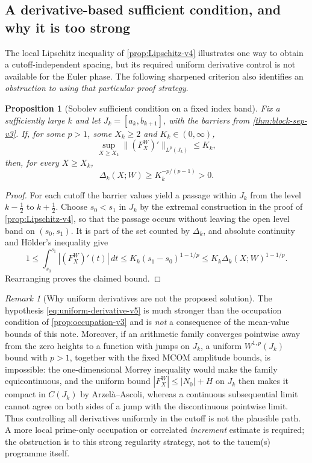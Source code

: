 \documentclass[11pt,a4paper]{article}
\numberwithin{equation}{section}
\newtheorem{proposition}[theorem]{Proposition}
\theoremstyle{definition}
\theoremstyle{remark}
\newtheorem{remark}[theorem]{Remark}
\begin{document}
\subsection{A derivative-based sufficient condition, and why it is too strong}
The local Lipschitz inequality of \cref{prop:Lipschitz-v4}
illustrates one way to obtain a cutoff-independent spacing, but
its required uniform derivative control is not available for the
Euler phase.  The following sharpened criterion also identifies an
\emph{obstruction to using that particular proof strategy}.
\begin{proposition}[Sobolev sufficient condition on a fixed index band]
\label{prop:sobolev-v5}
Fix a sufficiently large $k$ and let
$J_k=[a_k,b_{k+1}]$, with the barriers from
\cref{thm:block-sep-v3}.  If, for some $p>1$, some $X_k\ge2$ and
$K_k\in(0,\infty)$,
\begin{equation}\label{eq:uniform-derivative-v5}
 \sup_{X\ge X_k}\bigl\|(F_X^W)'\bigr\|_{L^p(J_k)}\le K_k,
\end{equation}
then, for every $X\ge X_k$,
\begin{equation}\label{eq:sobolev-spacing-v5}
 \boxed{\quad\Delta_k(X;W)\ge
 K_k^{-p/(p-1)}>0.\quad}
\end{equation}
\end{proposition}
\begin{proof}
For each cutoff the barrier values yield a passage within $J_k$
from the level $k-\tfrac12$ to $k+\tfrac12$.  Choose $s_0<s_1$ in
$J_k$ by the extremal construction in the proof of
\cref{prop:Lipschitz-v4}, so that the passage occurs without leaving
the open level band on $(s_0,s_1)$.  It is part of the
set counted by $\Delta_k$, and absolute continuity and H\"older's
inequality give
\begin{equation}
 1\le\int_{s_0}^{s_1}|(F_X^W)'(t)|\,dt
 \le K_k(s_1-s_0)^{1-1/p}
 \le K_k\Delta_k(X;W)^{1-1/p}.
\end{equation}
Rearranging proves the claimed bound.
\end{proof}
\begin{remark}[Why uniform derivatives are not the proposed solution]
The hypothesis \eqref{eq:uniform-derivative-v5} is much stronger
than the occupation condition of \cref{prop:occupation-v3} and is
\emph{not} a consequence of the mean-value bounds of this note.
Moreover, if an arithmetic family converges pointwise away from
the zero heights to a function with jumps on $J_k$, a uniform
$W^{1,p}(J_k)$ bound with $p>1$, together with the fixed MCOM
amplitude bounds, is impossible: the one-dimensional Morrey
inequality would make the family equicontinuous, and the uniform bound
$|F_X^W|\le|N_0|+H$ on $J_k$ then makes it compact in $C(J_k)$ by
Arzel\`a--Ascoli, whereas a continuous subsequential limit cannot agree
on both sides of a jump with the discontinuous pointwise limit.
Thus controlling all derivatives uniformly in the cutoff is not the
plausible path.  A more local prime-only occupation or correlated
\emph{increment} estimate is required; the obstruction is to this
strong regularity strategy, not to the taucm(s) programme itself.
\end{remark}
\end{document}

